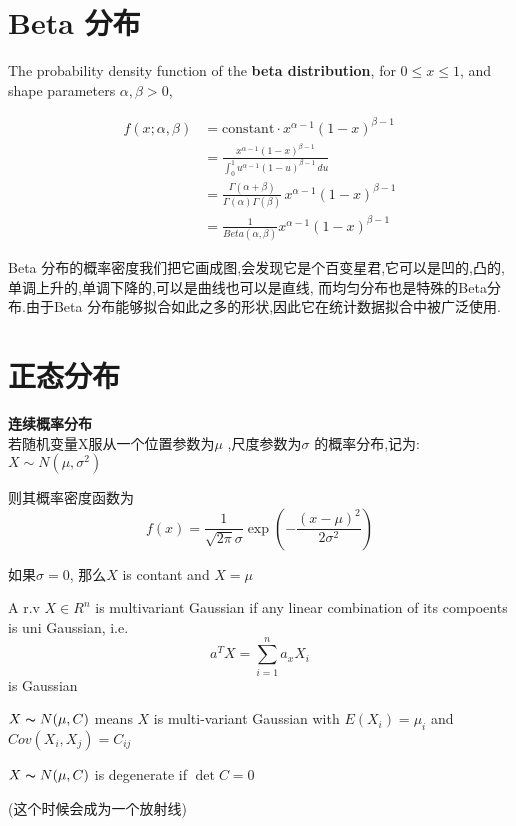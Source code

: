 \documentclass{article}
\begin{document}
\section{Beta 分布}
The probability density function of the \textbf{beta distribution}, for $0 \leq x \leq 1$, and shape parameters $\alpha, \beta > 0$, 

$$
\begin{aligned}
f(x;\alpha,\beta) & = \mathrm{constant}\cdot x^{\alpha-1}(1-x)^{\beta-1} \\
& = \frac{x^{\alpha-1}(1-x)^{\beta-1}}{\int_0^1 u^{\alpha-1} (1-u)^{\beta-1}\, du} \\
& = \frac{\Gamma(\alpha+\beta)}{\Gamma(\alpha)\Gamma(\beta)}\, x^{\alpha-1}(1-x)^{\beta-1} \\
& = \frac{1}{Beta(\alpha,\beta)} x^{\alpha-1}(1-x)^{\beta-1}
\end{aligned}
$$

Beta 分布的概率密度我们把它画成图,会发现它是个百变星君,它可以是凹的,凸的,单调上升的,单调下降的,可以是曲线也可以是直线,
而均匀分布也是特殊的Beta分布.由于Beta 分布能够拟合如此之多的形状,因此它在统计数据拟合中被广泛使用.

\section{正态分布}
\textbf{连续概率分布}\\
若随机变量X服从一个位置参数为$\mu$ ,尺度参数为$\sigma$ 的概率分布,记为:$X\sim N(\mu ,\sigma ^{2})$

则其概率密度函数为
$$f(x)=\frac{1}{\sqrt{2\pi} \sigma} \exp({- \dfrac{(x-\mu )^{2}}{2\sigma ^{2}}})$$

如果$\sigma = 0$, 那么$X$ is contant and $X = \mu$

\begin{definition}
A r.v $X \in R^n$ is multivariant Gaussian if any linear combination of its compoents is uni Gaussian, i.e.
$$a^T X = \sum_{i=1}^n a_x X_i$$ is Gaussian
\end{definition}

$X \thicksim{N}(\mu, C)$ means $X$ is multi-variant Gaussian with $E(X_i) = \mu_i$ and $Cov(X_i, X_j) = C_{ij}$

\begin{definition}
$X \thicksim{N}(\mu, C)$ is degenerate if $\det{C} = 0$
\end{definition}
(这个时候会成为一个放射线)
\end{document}
